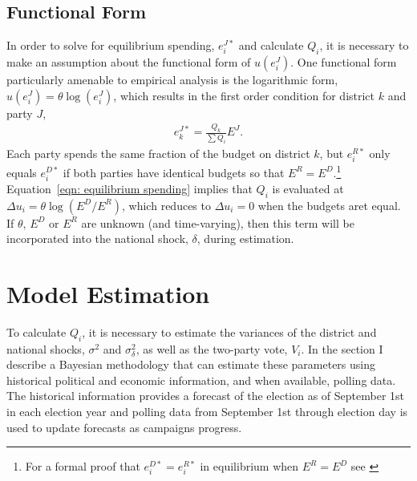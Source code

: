 \documentclass[12pt,final,fleqn]{article}
\theoremstyle{plain}
\begin{document}
\subsection{Functional Form} \label{sec: functional form}
In order to solve for equilibrium spending, $e_i^{J*}$ and calculate $Q_i$, it is necessary to make an assumption about the functional form of $u(e_i^J)$. One functional form particularly amenable to empirical analysis is the logarithmic form, $u(e_i^J)= \theta \log (e_i^J)$, which results in the first order condition for district $k$ and party $J$,
\begin{align} \label{eqn: equilibrium spending}
e_k^{J*} = \frac{Q_k}{\sum Q_i}E^{J}.
\end{align} 
Each party spends the same fraction of the budget on district $k$, but $e_i^{R*}$ only equals $e_i^{D*}$ if both parties have identical budgets so that $E^{R} = E^{D}$.\footnote{For a formal proof that $e_i^{D*} = e_i^{R*}$ in equilibrium when $E^R = E^D$ see \citet{stromberg2008electoral}} Equation~\ref{eqn: equilibrium spending} implies that $Q_i$ is evaluated at $\Delta u_i = \theta \log(E^D/E^R)$, which reduces to $\Delta u_i=0$ when the budgets aret equal. If $\theta$, $E^D$ or $E^R$ are unknown (and time-varying), then this term will be incorporated into the national shock, $\delta$, during estimation.

\section{Model Estimation}
To calculate $Q_i$, it is necessary to estimate the variances of the district and national shocks, $\sigma^2$ and $\sigma^2_\delta$, as well as the two-party vote, $V_i$. In the section I describe a Bayesian methodology that can estimate these parameters using historical political and economic information, and when available, polling data. The historical information provides a forecast of the election as of September 1st in each election year and polling data from September 1st through election day is used to update forecasts as campaigns progress. 
\end{document}
